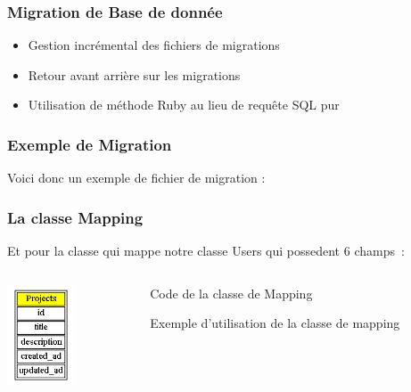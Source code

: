 \documentclass{beamer}
\begin{document}
\begin{frame}
    \frametitle{Migration de Base de donnée}
    \begin{itemize}
        \item Gestion incrémental des fichiers de migrations
        \item Retour avant arrière sur les migrations
        \item Utilisation de méthode Ruby au lieu de requête SQL pur
    \end{itemize}
\end{frame}
\begin{frame}
    \frametitle{Exemple de Migration}

    Voici donc un exemple de fichier de migration :


    \begin{center}
        
    \end{center}
\end{frame}

\begin{frame}
    \frametitle{La classe Mapping}
    Et pour la classe qui mappe notre classe Users qui possedent 6 champs~:
   
    \begin{columns}
        \begin{column}[l]{3cm}
            \includegraphics[width=20mm]{project.png}
        \end{column}
        
        \begin{column}[r]{10cm}
            \begin{block}{Code de la classe de Mapping}
                      
            \end{block}
            \begin{block}{Exemple d'utilisation de la classe de mapping}
                      
            \end{block}
        \end{column}
    \end{columns}

\end{frame}
\end{document}
